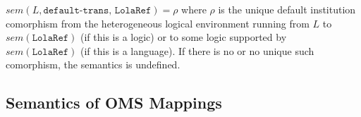 \documentclass[10pt,fleqn,%
\ifpretendfinal
final%
\else
draft%
\fi,
]{scrreprt}
\makeatletter
\newcommand*\CommentAuthor{}
\renewcommand*\CommentAuthor{#1}}
\newcommand*\CommentDate{}
\renewcommand*\CommentDate{#1}}
\newcommand*\CommentId{}
\renewcommand*\CommentId{#1}}
\newcommand*\CommentType{}
\renewcommand*\CommentType{#1}}
\newcommand*{\SetCommentColorByType}[1]{%
\edef\localType{{#1}}%
\expandafter\ifstrequal\localType{q-aut}{\colorlet{CommentColor}{red}}{%
\expandafter\ifstrequal\localType{q-all}{\colorlet{CommentColor}{orange}}{%
\expandafter\ifstrequal\localType{todo}{\colorlet{CommentColor}{orange}}{%
\expandafter\ifstrequal\localType{fyi}{\colorlet{CommentColor}{lightgray}}{%
\colorlet{CommentColor}{yellow}}}}}}
\newcommand*{\SetCommentPrefixByType}[1]{%
\edef\localType{{#1}}%
\expandafter\@ifmtarg\localType{%
\edef\CommentPrefix{}%
}{%
\caseupper[q]{#1}%
\edef\CommentPrefix{\thestring: }%
}}
\newcommand*{\initComment}[1]{%
\setkeys{Comment}{#1}%
\SetCommentColorByType{\CommentType}%
\relax%
\SetCommentPrefixByType{\CommentType}%
\relax%
}
\newcommand*{\todonote}[2][]{%
\initComment{#1}%
\pdfcomment[author=\CommentAuthor,color=CommentColor,date=\CommentDate,id=\CommentId]{%
\CommentPrefix
#2}}
\renewcommand*{\todonote}[2][]{%
\initComment{#1}%
\ednote{\CommentPrefix #2}}
\newcommand*{\CLnote}[2][author=Christoph Lange]{%
\todonote[author=Christoph Lange,#1]{#2} 
}
\newcommand*{\syntax}[1]{\texttt{#1}}
\newcommand{\ssclause}[1]{\subsection{#1}}
\makeatother
\begin{document}
$sem(L,\syntax{default-trans, LolaRef})=\rho$ where $\rho$ is the
unique default institution comorphism from the heterogeneous logical
environment running from $L$ to $sem(\syntax{LolaRef})$ (if this is a
logic) or to some logic supported by $sem(\syntax{LolaRef})$ (if this
is a language). If there is no or no unique such comorphism, the
semantics is undefined.




\ssclause{Semantics of OMS Mappings}

\end{document}
